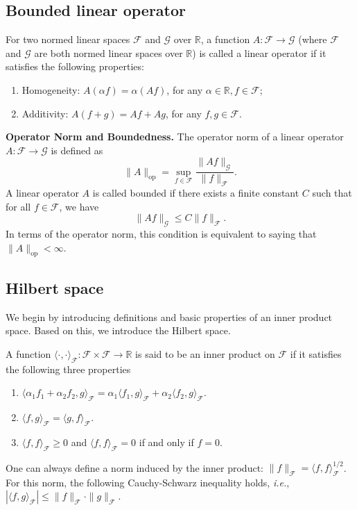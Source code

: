 \documentclass[
  12pt]{article}
\def\to{\rightarrow}
\def\mR{\mathbb{R}}
\def\cF{\mathcal{F}}
\def\cG{\mathcal{G}}
\begin{document}
\subsection{Bounded linear operator}\label{appx.linear_operators}
For two normed linear spaces $\cF$ and $\cG$ over $\mR$, a function $A: \cF\to \cG$ (where $\cF$ and $\cG$ are both normed linear spaces over $\mR$) is called a linear operator if it satisfies the following properties:
\begin{enumerate}
    \item Homogeneity: $A(\alpha f)=\alpha(Af)$, for any $\alpha\in \mR, f\in \cF$;
    \item Additivity: $A(f+g)=Af +Ag$, for any $f,g\in\cF$.
\end{enumerate}
\textbf{Operator Norm and Boundedness.} The operator norm of a linear operator $A: \cF\to \cG$ is defined as 
$$
\|A\|_{\mathrm{op}}=\sup_{f\in\mathcal{F}}\frac{\|Af\|_{\mathcal{G}}}{\|f\|_{\mathcal{F}}}.
$$
A linear operator $A$ is called bounded if there exists a finite constant $C$ such that for all $f\in\cF$, we have
$$
\|Af\|_\mathcal{G}\leq C\|f\|_\mathcal{F}.
$$
In terms of the operator norm, this condition is equivalent to saying that $\|A\|_{\mathrm{op}}<\infty$.

\subsection{Hilbert space}\label{appx.hilbert}
We begin by introducing definitions and basic properties of an inner product space. Based on this, we introduce the Hilbert space.

A function $\langle\cdot,\cdot\rangle_{\mathcal{F}}:\mathcal{F}\times\mathcal{F}\to\mathbb{R}$ is said to be an inner product on $\cF$ if it satisfies the following three properties
\begin{enumerate}
    \item $\langle\alpha_{1}f_{1}+\alpha_{2}f_{2},g\rangle_{\mathcal{F}}=\alpha_{1}\langle f_{1},g\rangle_{\mathcal{F}}+\alpha_{2}\langle f_{2},g\rangle_{\mathcal{F}}$.
    \item $\langle f,g\rangle_{\mathcal{F}}=\langle g,f\rangle_{\mathcal{F}}$.
    \item $\langle f,f\rangle_{\mathcal{F}}\geq0$ and $\langle f,f\rangle_{\mathcal{F}}=0$ if and only if $f=0$.
\end{enumerate}
One can always define a norm induced by the inner product: $\|f\|_{\mathcal{F}}=\langle f,f\rangle_{\mathcal{F}}^{1/2}$. For this norm, the following Cauchy-Schwarz inequality holds, \emph{i.e.},  $|\langle f,g\rangle_{\mathcal{F}}|\leq\|f\|_{\mathcal{F}}\cdot\|g\|_{\mathcal{F}}$. 
\end{document}
